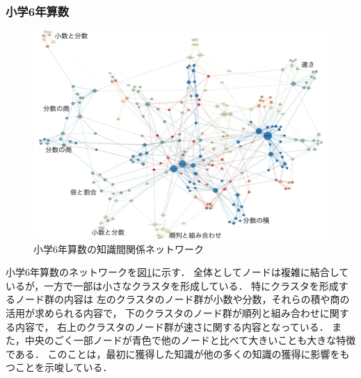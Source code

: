 \subsubsection{小学6年算数}
\begin{figure}[!htb]
\begin{center}
	\includegraphics[width=330pt]{./img/s6_mat_label2.pdf}
	\caption{小学6年算数の知識間関係ネットワーク}
	\label{fig:net_s6mat}
\end{center}
\end{figure}
小学6年算数のネットワークを図\ref{fig:net_s6mat}に示す．
全体としてノードは複雑に結合しているが，一方で一部は小さなクラスタを形成している．
特にクラスタを形成するノード群の内容は
左のクラスタのノード群が小数や分数，それらの積や商の活用が求められる内容で，
下のクラスタのノード群が順列と組み合わせに関する内容で，
右上のクラスタのノード群が速さに関する内容となっている．
また，中央のごく一部ノードが青色で他のノードと比べて大きいことも大きな特徴である．
このことは，最初に獲得した知識が他の多くの知識の獲得に影響をもつことを示唆している．




